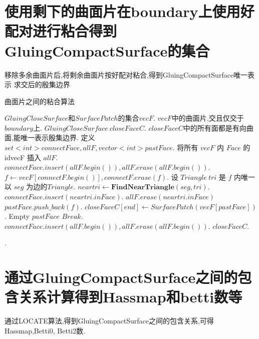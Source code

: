 \documentclass[a4paper]{book}
\renewcommand{\algorithmicrequire}{\textbf{输入:}}
\renewcommand{\algorithmicensure}{\textbf{输出:}}
\renewcommand{\algorithmicrequire}{\textbf{Input : }}
\renewcommand{\algorithmicrequire}{\textbf{Precondition : }}
\renewcommand{\algorithmicensure}{\textbf{Output : }}
\renewcommand{\algorithmicensure}{\textbf{Postcondition : }}
\numberwithin{equation}{chapter}
\theoremstyle{definition}
\begin{document}
\section{使用剩下的曲面片在boundary上使用好配对进行粘合得到GluingCompactSurface的集合}
移除多余曲面片后,将剩余曲面片按好配对粘合,得到GluingCompactSurface唯一表示
求交后的殷集边界

\begin{algorithm}
	\caption{曲面片之间的粘合算法}
	\begin{algorithmic}[1]
		\renewcommand{\algorithmicrequire}{\textbf{Input : }}
		\Require $GluingCloseSurface$和$SurfacePatch$的集合$vecF$.
		\renewcommand{\algorithmicrequire}{\textbf{Precondition : }}
		\Require $vecF$中的曲面片,交且仅交于$boundary$上.
		\renewcommand{\algorithmicensure}{\textbf{Output : }}
		\Ensure $GluingCloseSurface\ closeFaceC$.
		\renewcommand{\algorithmicensure}{\textbf{Postcondition : }}
		\Ensure $closeFaceC$中的所有面都是有向曲面,能唯一表示殷集边界.
		\State 定义 $set<int> connectFace,allF, vector<int> pastFace$.
		\State 将所有 $vecF$ 内 $Face$ 的idvecF 插入 $allF$. 
		\State $connectFace.insert(allF.begin()), allF.erase(allF.begin())$.
		\State $f \gets vecF[connectF.begin()], connectF.erase(f)$.
		\State 设 $Triangle\ tri$ 是 $f$ 内唯一以 $seg$ 为边的$Triangle$.
		\State $neartri \gets \textbf{FindNearTriangle}(seg,tri)$.
		\State $connectFace.insert(neartri.inFace)$.
		\State $allF.erase(neartri.inFace)$
        \State $pastFace.push\_back(f)$.
		\EndIf
		\EndFor
		\State $closeFaceC[end] \gets SurfacePatch(vecF[pastFace])$.
		\State Empty $pastFace$
		\State $Break$.
		\EndIf
		\State  $connectFace.insert(allF.begin()), allF.erase(allF.begin())$.
		\EndIf
		\EndWhile
		\State \Return $closeFaceC$.
		\EndFunction
	\end{algorithmic}
\end{algorithm}.


\section{通过GluingCompactSurface之间的包含关系计算得到Hassmap和betti数等}

通过LOCATE算法,得到GluingCompactSurface之间的包含关系,可得Hassmap,Betti0,
Betti2数.
\end{document}
